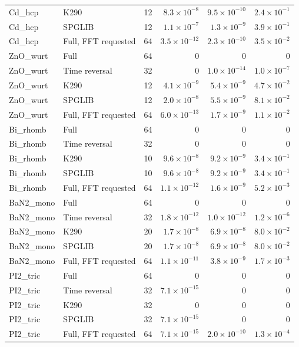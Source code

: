 \begin{table}[htbp]
\begin{tabular}{llrrrr}
Cd\_hcp & K290 & 12 & $8.3\times10^{-8}$ & $9.5\times10^{-10}$ & $2.4\times10^{-1}$ \\
Cd\_hcp & SPGLIB & 12 & $1.1\times10^{-7}$ & $1.3\times10^{-9}$ & $3.9\times10^{-1}$ \\
Cd\_hcp & Full, FFT requested & 64 & $3.5\times10^{-12}$ & $2.3\times10^{-10}$ & $3.5\times10^{-2}$ \\
ZnO\_wurt & Full & 64 & $0$ & $0$ & $0$ \\
ZnO\_wurt & Time reversal & 32 & $0$ & $1.0\times10^{-14}$ & $1.0\times10^{-7}$ \\
ZnO\_wurt & K290 & 12 & $4.1\times10^{-9}$ & $5.4\times10^{-9}$ & $4.7\times10^{-2}$ \\
ZnO\_wurt & SPGLIB & 12 & $2.0\times10^{-8}$ & $5.5\times10^{-9}$ & $8.1\times10^{-2}$ \\
ZnO\_wurt & Full, FFT requested & 64 & $6.0\times10^{-13}$ & $1.7\times10^{-9}$ & $1.1\times10^{-2}$ \\
Bi\_rhomb & Full & 64 & $0$ & $0$ & $0$ \\
Bi\_rhomb & Time reversal & 32 & $0$ & $0$ & $0$ \\
Bi\_rhomb & K290 & 10 & $9.6\times10^{-8}$ & $9.2\times10^{-9}$ & $3.4\times10^{-1}$ \\
Bi\_rhomb & SPGLIB & 10 & $9.6\times10^{-8}$ & $9.2\times10^{-9}$ & $3.4\times10^{-1}$ \\
Bi\_rhomb & Full, FFT requested & 64 & $1.1\times10^{-12}$ & $1.6\times10^{-9}$ & $5.2\times10^{-3}$ \\
BaN2\_mono & Full & 64 & $0$ & $0$ & $0$ \\
BaN2\_mono & Time reversal & 32 & $1.8\times10^{-12}$ & $1.0\times10^{-12}$ & $1.2\times10^{-6}$ \\
BaN2\_mono & K290 & 20 & $1.7\times10^{-8}$ & $6.9\times10^{-8}$ & $8.0\times10^{-2}$ \\
BaN2\_mono & SPGLIB & 20 & $1.7\times10^{-8}$ & $6.9\times10^{-8}$ & $8.0\times10^{-2}$ \\
BaN2\_mono & Full, FFT requested & 64 & $1.1\times10^{-11}$ & $3.8\times10^{-9}$ & $1.7\times10^{-3}$ \\
PI2\_tric & Full & 64 & $0$ & $0$ & $0$ \\
PI2\_tric & Time reversal & 32 & $7.1\times10^{-15}$ & $0$ & $0$ \\
PI2\_tric & K290 & 32 & $0$ & $0$ & $0$ \\
PI2\_tric & SPGLIB & 32 & $7.1\times10^{-15}$ & $0$ & $0$ \\
PI2\_tric & Full, FFT requested & 64 & $7.1\times10^{-15}$ & $2.0\times10^{-10}$ & $1.3\times10^{-4}$ \\
\bottomrule
\end{tabular}
\end{table}
